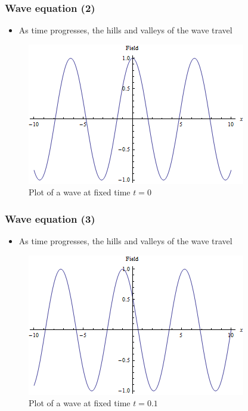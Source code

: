 \begin{frame}
    \frametitle{Wave equation (2)}

    \begin{itemize}
        \item As time progresses, the hills and valleys of the wave travel
    \end{itemize}

    \begin{figure}
        \includegraphics[height=0.65\textheight]{figures/Wave_t0.png}
        \caption{Plot of a wave at fixed time $t=0$}
    \end{figure}

\end{frame}


\begin{frame}
    \frametitle{Wave equation (3)}

    \begin{itemize}
        \item As time progresses, the hills and valleys of the wave travel
    \end{itemize}

    \begin{figure}
        \includegraphics[height=0.65\textheight]{figures/Wave_t01.png}
        \caption{Plot of a wave at fixed time $t=0.1$}
    \end{figure}

\end{frame}


